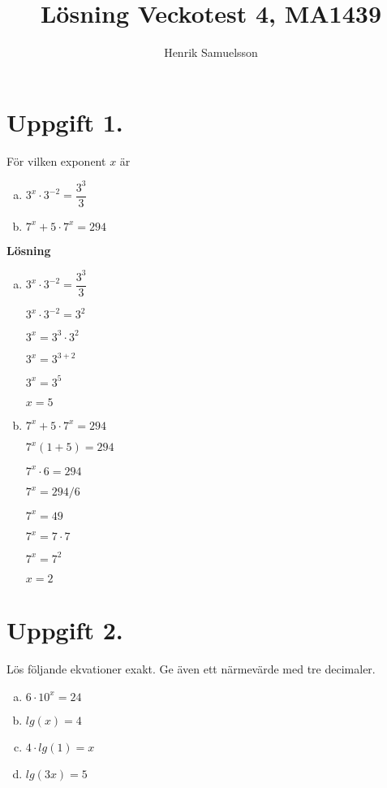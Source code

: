 \documentclass{article}
\begin{document}
\begin{titlepage}
\title{Lösning Veckotest 4, MA1439}
\author{Henrik Samuelsson}
\maketitle
\thispagestyle{empty}
\end{titlepage}

\section*{Uppgift 1.}
För vilken exponent $x$ är
\begin{enumerate}[(a)]
\item $3^x \cdot 3^{-2}=\dfrac{3^3}{3}$
\item $7^x + 5 \cdot 7^x = 294$
\end{enumerate}

\textbf{Lösning}
\begin{enumerate}[(a)]
\item $ 3^x \cdot 3^{-2} = \dfrac{3^3}{3} $

$ 3^x \cdot 3^{-2} = 3^2 $

$ 3^x = 3^3 \cdot 3^2 $

$ 3^x = 3^{3 + 2} $

$ 3^x  = 3^5 $

$ x = 5 $
\item $ 7^x + 5 \cdot 7^x = 294 $

$ 7^x(1 + 5) = 294 $

$ 7^x \cdot 6 = 294 $

$ 7^x = 294 / 6 $

$ 7^x = 49 $

$ 7^x = 7 \cdot 7 $

$ 7^x = 7^2 $

$ x = 2 $
\end{enumerate}

\section*{Uppgift 2.}

Lös följande ekvationer exakt. Ge även ett närmevärde med tre decimaler.  
\begin{enumerate}[(a)]
\item $ 6 \cdot 10^x = 24 $
\item $ lg(x) = 4 $
\item $ 4 \cdot lg(1) = x $
\item $ lg(3x) = 5 $
\end{enumerate}
\end{document}
